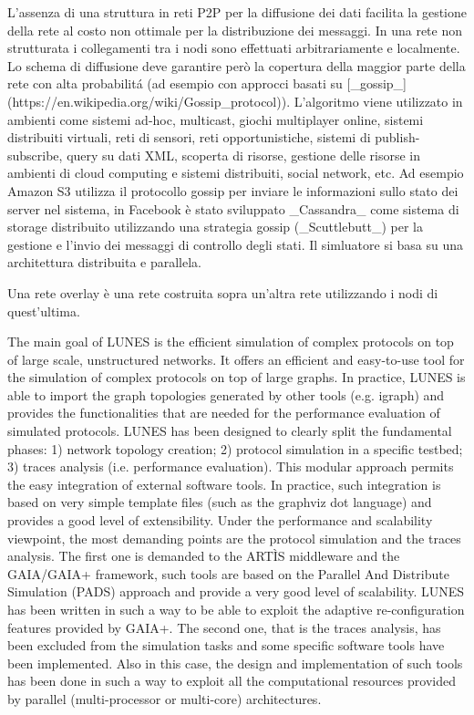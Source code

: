 L'assenza di una struttura in reti P2P per la diffusione dei dati facilita la gestione della rete al costo non ottimale per la distribuzione dei messaggi.
In una rete non strutturata i collegamenti tra i nodi sono effettuati arbitrariamente e localmente.
Lo schema di diffusione deve garantire però la copertura della maggior parte della rete con alta probabilitá (ad esempio con approcci basati su [\_gossip\_](https://en.wikipedia.org/wiki/Gossip\_protocol)). L'algoritmo viene utilizzato in ambienti come sistemi ad-hoc, multicast, giochi multiplayer online, sistemi distribuiti virtuali, reti di sensori, reti opportunistiche, sistemi di publish-subscribe, query su dati XML, scoperta di risorse, gestione delle risorse in ambienti di cloud computing e sistemi distribuiti, social network, etc.
Ad esempio Amazon S3 utilizza il protocollo gossip per inviare le informazioni sullo stato dei server nel sistema, in Facebook è stato sviluppato \_Cassandra\_ come sistema di storage distribuito utilizzando una strategia gossip (\_Scuttlebutt\_) per la gestione e l'invio dei messaggi di controllo degli stati.
Il simluatore si basa su una architettura distribuita e parallela.

Una rete overlay è una rete costruita sopra un'altra rete utilizzando i nodi di quest'ultima.

The main goal of LUNES is the efficient simulation of complex protocols on top of large scale, unstructured networks. It offers an efficient and easy-to-use tool for the simulation of complex protocols on top of large graphs. In practice, LUNES is able to import the graph topologies generated by other tools (e.g. igraph) and provides the functionalities that are needed for the performance evaluation of simulated protocols. LUNES has been designed to clearly split the fundamental phases: 1) network topology creation; 2) protocol simulation in a specific testbed; 3) traces analysis (i.e. performance evaluation). This modular approach permits the easy integration of external software tools. In practice, such integration is based on very simple template files (such as the graphviz dot language) and provides a good level of extensibility. Under the performance and scalability viewpoint, the most demanding points are the protocol simulation and the traces analysis. The first one is demanded to the ARTÌS middleware and the GAIA/GAIA+ framework, such tools are based on the Parallel And Distribute Simulation (PADS) approach and provide a very good level of scalability. LUNES has been written in such a way to be able to exploit the adaptive re-configuration features provided by GAIA+. The second one, that is the traces analysis, has been excluded from the simulation tasks and some specific software tools have been implemented. Also in this case, the design and implementation of such tools has been done in such a way to exploit all the computational resources provided by parallel (multi-processor or multi-core) architectures.

